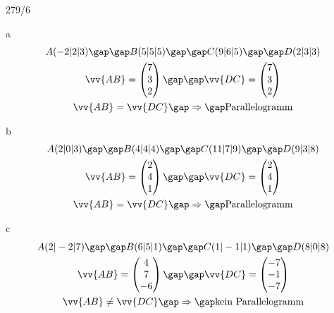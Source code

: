\begin{exercise}{279/6}
  \item [a]
  \begin{gather*}
    A(-2|2|3) \gap\gap B(5|5|5) \gap\gap C(9|6|5) \gap\gap D(2|3|3) \\
    \vv{AB} = \begin{pmatrix}7 \\ 3 \\ 2\end{pmatrix} \gap\gap \vv{DC} = \begin{pmatrix}7 \\ 3 \\ 2\end{pmatrix} \\
    \vv{AB} = \vv{DC} \gap\Rightarrow\gap \text{Parallelogramm}
  \end{gather*}
  \item [b]
  \begin{gather*}
    A(2|0|3) \gap\gap B(4|4|4) \gap\gap C(11|7|9) \gap\gap D(9|3|8) \\
    \vv{AB} = \begin{pmatrix}2 \\ 4 \\ 1\end{pmatrix} \gap\gap \vv{DC} = \begin{pmatrix}2 \\ 4 \\ 1\end{pmatrix} \\
    \vv{AB} = \vv{DC} \gap\Rightarrow\gap \text{Parallelogramm}
  \end{gather*}
  \item [c]
  \begin{gather*}
    A(2|-2|7) \gap\gap B(6|5|1) \gap\gap C(1|-1|1) \gap\gap D(8|0|8) \\
    \vv{AB} = \begin{pmatrix}4 \\ 7 \\ -6\end{pmatrix} \gap\gap \vv{DC} = \begin{pmatrix}-7 \\ -1 \\ -7\end{pmatrix} \\
    \vv{AB} \neq \vv{DC} \gap\Rightarrow\gap \text{kein Parallelogramm}
  \end{gather*}
\end{exercise}
\newpage

